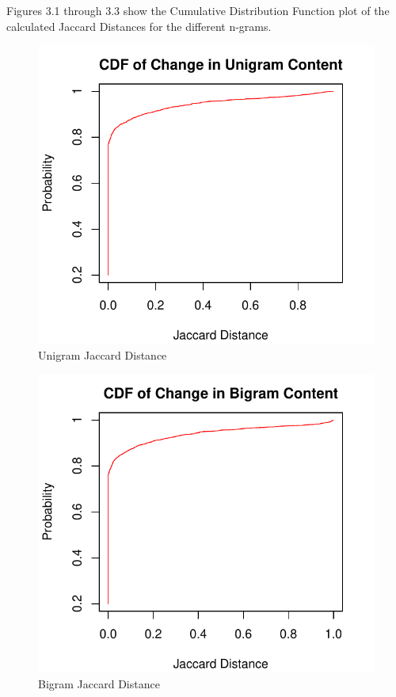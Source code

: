 \documentclass[a4paper,12pt]{article}
\begin{document}
Figures 3.1 through 3.3 show the Cumulative Distribution Function plot of the calculated Jaccard Distances
for the different n-grams.

\begin{figure}[H]
    \centering
    \includegraphics{stats/q1_unigrams.pdf}
    \caption{Unigram Jaccard Distance}
\end{figure}
\begin{figure}[H]
    \centering
    \includegraphics{stats/q1_bigrams.pdf}
    \caption{Bigram Jaccard Distance}
\end{figure}
\end{document}
